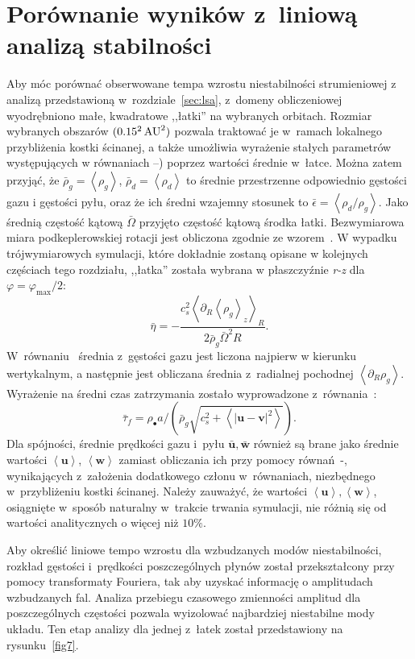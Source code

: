 \section{Porównanie wyników z~liniową analizą stabilności}
\label{sec:simulation_analysis}
Aby móc porównać obserwowane tempa wzrostu niestabilności strumieniowej z
analizą przedstawioną w~rozdziale~\ref{sec:lsa}, z~domeny obliczeniowej
wyodrębniono małe, kwadratowe ,,łatki'' na wybranych orbitach. Rozmiar wybranych
obszarów $(0.15^2\hbox{$\thinspace\textrm{AU}$}^2)$ pozwala traktować je w~ramach lokalnego przybliżenia
kostki ścinanej, a także umożliwia wyrażenie stałych parametrów występujących w
równaniach --) poprzez wartości średnie w~łatce.
Można zatem przyjąć, że $\bar{\rho}_g = \left<\rho_g\right>$, $\bar{\rho}_d =
\left<\rho_d\right>$ to średnie przestrzenne odpowiednio gęstości gazu i
gęstości pyłu, oraz że ich średni wzajemny stosunek to $\bar{\epsilon} =
\left<\rho_d / \rho_g\right>$. Jako średnią częstość kątową $\bar{\Omega}$
przyjęto częstość kątową środka łatki. Bezwymiarowa miara podkeplerowskiej
rotacji jest obliczona zgodnie ze wzorem~. 
W wypadku trójwymiarowych symulacji, które dokładnie zostaną opisane
w kolejnych częściach tego rozdziału, ,,łatka'' została wybrana w
płaszczyźnie {\it r-z} dla $\varphi = \varphi_\textrm{max} / 2$:
%
\begin{equation}
   \bar{\eta} = -\frac{c_s^2\left<\partial_R \left<\rho_g\right>_z\right>_R}
      {2\bar{\rho}_g\bar{\Omega}^2 R}.
   \label{eq:meaneta}
\end{equation}
%
W~równaniu~ średnia z~gęstości gazu jest liczona najpierw w
kierunku wertykalnym, a następnie jest obliczana średnia z~radialnej pochodnej 
$\left<\partial_R \rho_g\right>$. Wyrażenie na średni czas zatrzymania zostało
wyprowadzone z~równania~:
\begin{equation}
   \bar{\tau}_f = \rho_\bullet a / \left(\bar{\rho}_g \sqrt{c_s^2 +
   \left<\left|\mathbf{u} - \mathbf{v}\right|^2\right>} \right).
\end{equation}
%
Dla spójności, średnie prędkości gazu i~pyłu $\bar{\mathbf{u}},
\bar{\mathbf{w}}$ również są brane jako średnie wartości
$\left<\mathbf{u}\right>$, $\left<\mathbf{w}\right>$ zamiast obliczania ich przy
pomocy równań~-, wynikających z~założenia dodatkowego
członu w~równaniach, niezbędnego w~przybliżeniu kostki ścinanej. 
Należy zauważyć, że wartości $\left<\mathbf{u}\right>, \left<\mathbf{w}\right>$,
osiągnięte w~sposób naturalny w~trakcie trwania symulacji, nie różnią się od
wartości analitycznych o więcej niż $10\%$.
\par Aby określić liniowe tempo wzrostu dla wzbudzanych modów niestabilności,
rozkład gęstości i~prędkości poszczególnych płynów został przekształcony przy
pomocy transformaty Fouriera, tak aby uzyskać informację o amplitudach
wzbudzanych fal. Analiza przebiegu czasowego zmienności amplitud dla
poszczególnych częstości pozwala wyizolować najbardziej niestabilne mody układu.
Ten etap analizy dla jednej z~łatek został przedstawiony na rysunku~\ref{fig7}.

